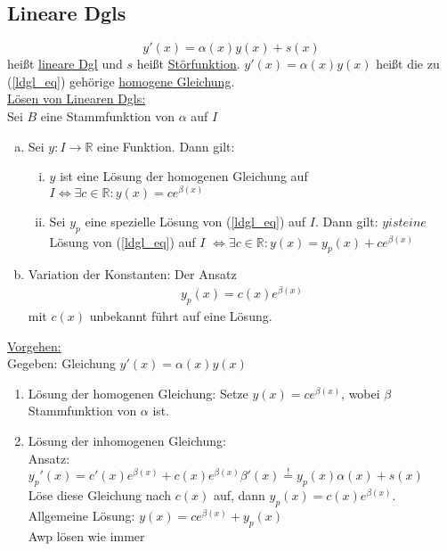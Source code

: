 \subsection{Lineare Dgls}
\begin{equation} \label{ldgl_eq}
    y'(x) = \alpha(x) y(x) + s(x) 
\end{equation}
heißt \underline{lineare Dgl} und $s$ heißt \underline{Störfunktion}. $y'(x)=\alpha(x)y(x)$ heißt die zu (\ref{ldgl_eq}) gehörige \underline{homogene Gleichung}. \\
\underline{Lösen von Linearen Dgls:} \\
Sei $B$ eine Stammfunktion von $\alpha$ auf $I$
\begin{enumerate} [a)]
    \item Sei $y: I \to \mathbb{R}$ eine Funktion. Dann gilt:
    \begin{enumerate} [i)]
        \item $y$ ist eine Lösung der homogenen Gleichung auf $I \Leftrightarrow \exists c \in \mathbb{R}: y(x) = ce^{\beta(x)}$
        \item Sei $y_p$ eine spezielle Lösung von (\ref{ldgl_eq}) auf $I$. Dann gilt: $y ist eine$ Lösung von (\ref{ldgl_eq}) auf $I$
        $\Leftrightarrow \exists c \in \mathbb{R}: y(x) = y_p(x) + ce^{\beta(x)}$
    \end{enumerate}
    \item Variation der Konstanten: Der Ansatz 
    \begin{align*}
        y_p(x) = c(x)e^{\beta(x)}
    \end{align*}
    mit $c(x)$ unbekannt führt auf eine Lösung.
\end{enumerate}
\underline{Vorgehen:} \\
Gegeben: Gleichung $y'(x) = \alpha(x)y(x)$
\begin{enumerate}
    \item Lösung der homogenen Gleichung: Setze $y(x) = ce^{\beta(x)}$, wobei $\beta$ Stammfunktion von $\alpha$ ist.
    \item Lösung der inhomogenen Gleichung: \\
    Ansatz: $y_p'(x) = c'(x)e^{\beta(x)} + c(x) e^{\beta(x)}\beta'(x) \stackrel{\text{!}}{=} y_p(x)\alpha(x) + s(x)$ \\
    Löse diese Gleichung nach $c(x)$ auf, dann $y_p(x) = c(x)e^{\beta(x)}$. Allgemeine Lösung: $y(x)=ce^{\beta(x)} + y_p(x)$ \\
    Awp lösen wie immer
\end{enumerate}

